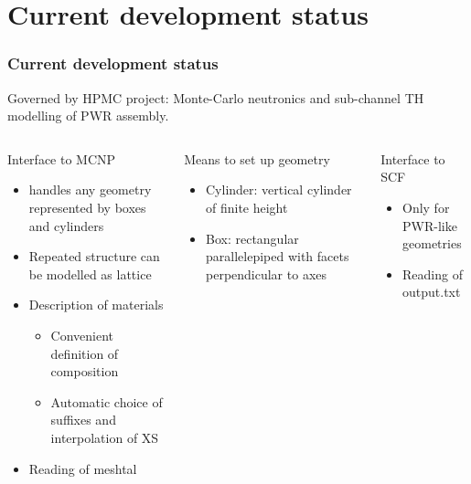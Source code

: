 \documentclass[t]{beamer}
\begin{document}
\section{Current development status}
\begin{frame}\frametitle{Current development status}
    Governed by HPMC project: Monte-Carlo neutronics and sub-channel TH modelling of PWR assembly.

    
    \begin{columns}
    \begin{block}{Interface to MCNP}
        \begin{itemize}
            \item handles any geometry represented by boxes and cylinders
            \item Repeated structure can be modelled as lattice 
            \item Description of materials
                \begin{itemize}
                    \item Convenient definition of composition
                    \item Automatic choice of suffixes and interpolation of XS
                \end{itemize}
            \item Reading of meshtal
        \end{itemize}
    \end{block}

    \begin{block}{Means to set up geometry} 
        \begin{itemize}
            \item Cylinder: vertical cylinder of finite height
            \item Box: rectangular parallelepiped with facets perpendicular to axes
        \end{itemize}
    \end{block}
    \begin{block}{Interface to SCF}
        \begin{itemize}
            \item Only for PWR-like geometries
            \item Reading of output.txt
        \end{itemize}
    \end{block}
    \end{columns}

\end{frame}
\end{document}
